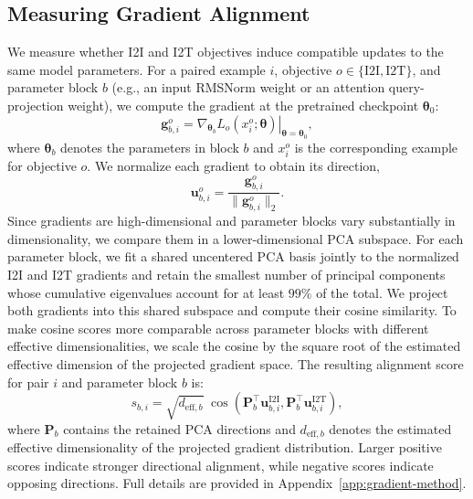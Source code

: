 \subsection{Measuring Gradient Alignment}
We measure whether I2I and I2T objectives induce compatible updates to the same model parameters.
For a paired example \(i\), objective \(o\in\{\mathrm{I2I},\mathrm{I2T}\}\), and parameter block \(b\) (e.g., an input RMSNorm weight or an attention query-projection weight), we compute the gradient at the pretrained checkpoint \(\boldsymbol{\theta}_0\):
$$
\mathbf{g}^{o}_{b,i}
=
\left.
\nabla_{\boldsymbol{\theta}_b}
L_o(x^{o}_i;\boldsymbol{\theta})
\right|_{\boldsymbol{\theta}=\boldsymbol{\theta}_0},
$$
where \(\boldsymbol{\theta}_b\) denotes the parameters in block \(b\) and \(x_i^o\) is the corresponding example for objective \(o\).
We normalize each gradient to obtain its direction,
$$
\mathbf{u}^{o}_{b,i}
=
\frac{\mathbf{g}^{o}_{b,i}}
{\|\mathbf{g}^{o}_{b,i}\|_2}.
$$
Since gradients are high-dimensional and parameter blocks vary substantially in dimensionality, we compare them in a lower-dimensional PCA subspace.
For each parameter block, we fit a shared uncentered PCA basis jointly to the normalized I2I and I2T gradients and retain the smallest number of principal components whose cumulative eigenvalues account for at least \(99\%\) of the total.
We project both gradients into this shared subspace and compute their cosine similarity.
To make cosine scores more comparable across parameter blocks with different effective dimensionalities, we scale the cosine by the square root of the estimated effective dimension of the projected gradient space.
The resulting alignment score for pair \(i\) and parameter block \(b\) is:
$$
s_{b,i}
=
\sqrt{d_{\mathrm{eff},b}}\;
\cos\!\left(
\mathbf{P}_b^\top \mathbf{u}^{\mathrm{I2I}}_{b,i},
\mathbf{P}_b^\top \mathbf{u}^{\mathrm{I2T}}_{b,i}
\right),
$$
where \(\mathbf{P}_b\) contains the retained PCA directions and
\(d_{\mathrm{eff},b}\) denotes the estimated effective dimensionality of the projected gradient distribution.
Larger positive scores indicate stronger directional alignment, while negative scores indicate opposing directions.
Full details are provided in Appendix~\ref{app:gradient-method}. 
